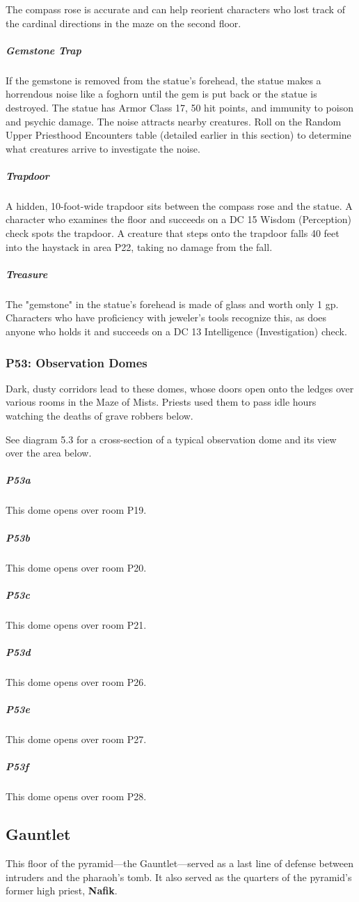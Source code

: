\documentclass[10pt,a4paper,twoside,bg=print,twocolumn,openany,nodeprecatedcode]{dndbook}
\begin{document}
The compass rose is accurate and can help reorient characters who lost track of the cardinal directions in the maze on the second floor.

\subparagraph{Gemstone Trap}
If the gemstone is removed from the statue's forehead, the statue makes a horrendous noise like a foghorn until the gem is put back or the statue is destroyed. The statue has Armor Class 17, 50 hit points, and immunity to poison and psychic damage. The noise attracts nearby creatures. Roll on the Random Upper Priesthood Encounters table (detailed earlier in this section) to determine what creatures arrive to investigate the noise.

\subparagraph{Trapdoor}
A hidden, 10-foot-wide trapdoor sits between the compass rose and the statue. A character who examines the floor and succeeds on a DC 15 Wisdom (Perception) check spots the trapdoor. A creature that steps onto the trapdoor falls 40 feet into the haystack in area P22, taking no damage from the fall.

\subparagraph{Treasure}
The "gemstone" in the statue's forehead is made of glass and worth only 1 gp. Characters who have proficiency with jeweler's tools recognize this, as does anyone who holds it and succeeds on a DC 13 Intelligence (Investigation) check.

\subsubsection{P53: Observation Domes}
Dark, dusty corridors lead to these domes, whose doors open onto the ledges over various rooms in the Maze of Mists. Priests used them to pass idle hours watching the deaths of grave robbers below.

See diagram 5.3 for a cross-section of a typical observation dome and its view over the area below.

\subparagraph{P53a}
This dome opens over room P19.

\subparagraph{P53b}
This dome opens over room P20.

\subparagraph{P53c}
This dome opens over room P21.

\subparagraph{P53d}
This dome opens over room P26.

\subparagraph{P53e}
This dome opens over room P27.

\subparagraph{P53f}
This dome opens over room P28.

\subsection{Gauntlet}
This floor of the pyramid—the Gauntlet—served as a last line of defense between intruders and the pharaoh's tomb. It also served as the quarters of the pyramid's former high priest, \textbf{Nafik}.
\end{document}

